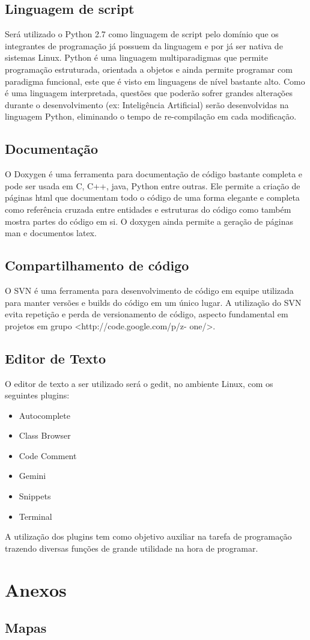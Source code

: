 \documentclass[10pt,a4paper]{article}
\begin{document}
\subsection{Linguagem de script}
	Será utilizado o Python 2.7 como linguagem de script pelo domínio que os integrantes de
programação já possuem da linguagem e por já ser nativa de sistemas Linux. Python é uma linguagem
multiparadigmas que permite programação estruturada, orientada a objetos e ainda permite programar
com paradigma funcional, este que é visto em linguagens de nível bastante alto. Como é uma linguagem
interpretada, questões que poderão sofrer grandes alterações durante o desenvolvimento (ex:
Inteligência Artificial) serão desenvolvidas na linguagem Python, eliminando o tempo de re-compilação
em cada modificação.

\subsection{Documentação}
	O Doxygen é uma ferramenta para documentação de código bastante completa e pode ser
usada em C, C++, java, Python entre outras. Ele permite a criação de páginas html que documentam
todo o código de uma forma elegante e completa como referência cruzada entre entidades e estruturas
do código como também mostra partes do código em si. O doxygen ainda permite a geração de páginas
man e documentos latex.

\subsection{Compartilhamento de código}
	O SVN é uma ferramenta para desenvolvimento de código em equipe utilizada para manter
versões e builds do código em um único lugar. A utilização do SVN evita repetição e perda de
versionamento de código, aspecto fundamental em projetos em grupo <http://code.google.com/p/z-
one/>.

\subsection{Editor de Texto}
	O editor de texto a ser utilizado será o gedit, no ambiente Linux, com os seguintes plugins:
\begin{itemize}
\item Autocomplete
\item Class Browser
\item Code Comment
\item Gemini
\item Snippets
\item Terminal
\end{itemize}
	A utilização dos plugins tem como objetivo auxiliar na tarefa de programação trazendo diversas
funções de grande utilidade na hora de programar.

\section{Anexos}
\subsection{Mapas}
\end{document}

